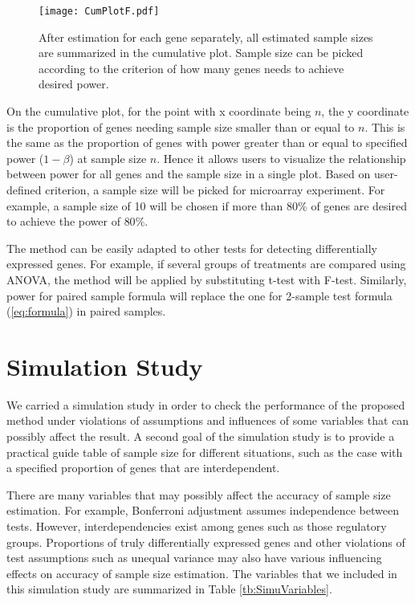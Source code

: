 \documentclass{bioinfo}
\begin{document}
\begin{figure}[h]
    \centerline{\texttt{[image: CumPlotF.pdf]}}
    \caption[Cumulative Plot of Sample Size Calculated for All Genes]
    {After estimation for each gene separately, all estimated sample sizes are summarized in the cumulative plot. Sample size
    can be picked according to the criterion of how many genes needs to achieve desired power.}
    \label{fig:CumPlot}
\end{figure}

On the cumulative plot, for the point with x coordinate being $n$,
the y coordinate is the proportion of genes needing sample size
smaller than or equal to $n$. This is the same as the proportion
of genes with power greater than or equal to specified power ($1-
\beta$) at sample size $n$. Hence it allows users to visualize the
relationship between power for all genes and the sample size in a
single plot. Based on user-defined criterion, a sample size will
be picked for microarray experiment. For example, a sample size of
10 will be chosen if more than $80\%$ of genes are desired to
achieve the power of $80\%$.

The method can be easily adapted to other tests for detecting
differentially expressed genes. For example, if several groups of
treatments are compared using ANOVA, the method will be applied by
substituting t-test  with F-test. Similarly, power for paired
sample formula will replace the one for 2-sample test formula
(\ref{eq:formula}) in paired samples.


\section{Simulation Study}
We carried a simulation study in order to check the performance of the proposed method under violations of assumptions and
influences of some variables that can possibly affect the result. A second goal of the simulation study is to provide a
practical guide table of sample size for different situations, such as the case with a specified proportion of genes that are
interdependent.

There are many variables that may possibly affect the accuracy of sample size estimation. For example, Bonferroni adjustment
assumes independence between tests. However, interdependencies exist among genes such as those regulatory groups. Proportions
of truly differentially expressed genes and other violations of test assumptions such as unequal variance may also have various
influencing effects on accuracy of sample size estimation. The variables that we included in this simulation study are
summarized in Table \ref{tb:SimuVariables}.
\end{document}
